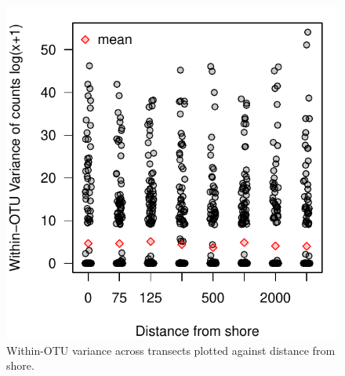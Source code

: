 \documentclass[11pt,letterpaper]{article} %
\begin{document}
{\begin{figure}[h!] %
  \centering
    \includegraphics[width=1\textwidth]{../../Figures/variance_from_shore.pdf}
    \caption{Within-OTU variance across transects plotted against distance from shore.}
  \label{variance_from_shore} %
\end{figure}

}
\end{document}
